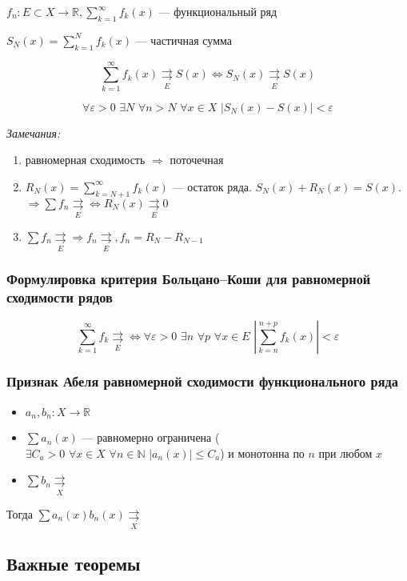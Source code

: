 \documentclass{article}
\def\dbl{\,\,}
\def\rsh#1{\underset{#1}{\rightrightarrows}}
\def\rshe{\rsh{E}}
\begin{document}
$f_n: E \subset X \rightarrow \mathbb{R}, \sum_{k = 1}^{\infty} f_k(x)$ --- функциональный ряд

$S_N(x) = \sum_{k = 1}^N f_k(x)$ --- частичная сумма

\[\sum_{k = 1}^{\infty} f_k(x) \rsh{E} S(x) \Leftrightarrow S_N(x) \rshe S(x)\]

\[\forall \varepsilon > 0 \dbl \exists N \dbl \forall n > N \dbl \forall x \in X \dbl \left|S_N(x) - S(x)\right| < \varepsilon\]

\textit{Замечания:}

\begin{enumerate}
    \item равномерная сходимость $\Rightarrow$ поточечная
    \item $R_N(x) = \sum_{k = N + 1}^{\infty} f_k(x)$ --- остаток ряда. $S_N(x) + R_N(x) = S(x)$. $\Rightarrow \sum f_n \rshe \Leftrightarrow R_N(x) \rshe 0$
    \item $\sum f_n \rshe \Rightarrow f_n \rshe, f_n = R_{N} - R_{N - 1}$
\end{enumerate}

\subsubsection{Формулировка критерия Больцано--Коши для равномерной сходимости рядов}

\[\sum_{k = 1}^{\infty} f_k \rshe \Leftrightarrow \forall \varepsilon > 0 \dbl \exists n \dbl \forall p \dbl \forall x \in E \dbl \left|\sum_{k = n}^{n + p} f_k(x)\right| < \varepsilon \]

\subsubsection{Признак Абеля равномерной сходимости функционального ряда}

\begin{itemize}
    \item $a_n, b_n: X \rightarrow \mathbb{R}$
    \item $\sum a_n(x)$ --- равномерно ограничена ($\exists C_a > 0 \dbl \forall x \in X \dbl \forall n \in \mathbb{N} \dbl |a_n(x)| \le C_a$) и монотонна по $n$ при любом $x$
    \item $\sum b_n \rsh{X}$
\end{itemize}

Тогда $\sum a_n(x) b_n(x) \rsh{X}$

\newpage

\subsection{Важные теоремы}
\end{document}
